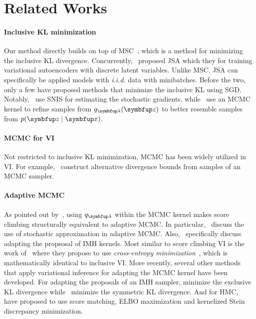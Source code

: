 \vspace{-0.05in}
\section{Related Works}\label{section:related}
\vspace{-0.05in}
\paragraph{Inclusive KL minimization}
Our method directly builds on top of MSC~\citep{NEURIPS2020_b2070693}, which is a method for minimizing the inclusive KL divergence.
Concurrently,~\citet{pmlr-v124-ou20a} proposed JSA which they for training variational autoencoders with discrete latent variables.
Unlike MSC, JSA can specifically be applied models with \textit{i.i.d.} data with minibatches.
Before the two, only a few have proposed methods that minimize the inclusive KL using SGD.
Notably,~\citet{DBLP:journals/corr/BornscheinB14} use SNIS for estimating the stochastic gradients, while~\citet{li_approximate_2017} use an MCMC kernel to refine samples from \(q_{\vlambda}(\vz)\) to better resemble samples from \(p(\vz\mid\vx)\).

\vspace{-0.1in}
\paragraph{MCMC for VI}
Not restricted to inclusive KL minimization, MCMC has been widely utilized in VI.
For example,~\citet{pmlr-v37-salimans15, pmlr-v97-ruiz19a} construct alternative divergence bounds from samples of an MCMC sampler.

\vspace{-0.1in}
\paragraph{Adaptive MCMC}
As pointed out by~\citet{pmlr-v124-ou20a}, using \(q_{\vlambda}\) within the MCMC kernel makes score climbing structurally equivalent to adaptive MCMC.
In particular,~\citet{10.1007/s11222-008-9110-y, garthwaite_adaptive_2016} discuss the use of stochastic approximation in adaptive MCMC.
Also,~\citet{andrieu_ergodicity_2006, keith_adaptive_2008, holden_adaptive_2009, giordani_adaptive_2010} specifically discuss adapting the propsosal of IMH kernels.
Most similar to score climbing VI is the work of~\citet{keith_adaptive_2008} where they propose to use \textit{cross-entropy minimization}~\citep{barbakh_cross_2009}, which is mathematically identical to inclusive VI.
More recently, several other methods that apply variational inference for adapting the MCMC kernel have been developed.
For adapting the proposals of an IMH sampler, \citet{habib2018auxiliary} minimize the exclusive KL divergence while~\cite{neklyudov_metropolishastings_2019} minimize the symmetric KL divergence.
And for HMC,~\citet{zhang_variational_2018, pmlr-v139-campbell21a} have proposed to use score matching, ELBO maximization and kernelized Stein discrepancy minimization.

